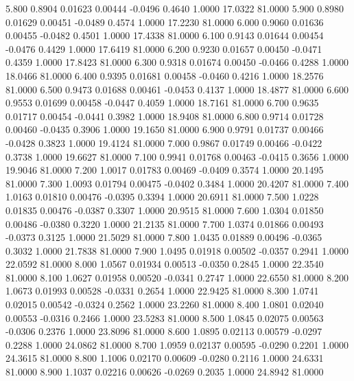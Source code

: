    5.800   0.8904   0.01623   0.00444  -0.0496   0.4640   1.0000  17.0322  81.0000
   5.900   0.8980   0.01629   0.00451  -0.0489   0.4574   1.0000  17.2230  81.0000
   6.000   0.9060   0.01636   0.00455  -0.0482   0.4501   1.0000  17.4338  81.0000
   6.100   0.9143   0.01644   0.00454  -0.0476   0.4429   1.0000  17.6419  81.0000
   6.200   0.9230   0.01657   0.00450  -0.0471   0.4359   1.0000  17.8423  81.0000
   6.300   0.9318   0.01674   0.00450  -0.0466   0.4288   1.0000  18.0466  81.0000
   6.400   0.9395   0.01681   0.00458  -0.0460   0.4216   1.0000  18.2576  81.0000
   6.500   0.9473   0.01688   0.00461  -0.0453   0.4137   1.0000  18.4877  81.0000
   6.600   0.9553   0.01699   0.00458  -0.0447   0.4059   1.0000  18.7161  81.0000
   6.700   0.9635   0.01717   0.00454  -0.0441   0.3982   1.0000  18.9408  81.0000
   6.800   0.9714   0.01728   0.00460  -0.0435   0.3906   1.0000  19.1650  81.0000
   6.900   0.9791   0.01737   0.00466  -0.0428   0.3823   1.0000  19.4124  81.0000
   7.000   0.9867   0.01749   0.00466  -0.0422   0.3738   1.0000  19.6627  81.0000
   7.100   0.9941   0.01768   0.00463  -0.0415   0.3656   1.0000  19.9046  81.0000
   7.200   1.0017   0.01783   0.00469  -0.0409   0.3574   1.0000  20.1495  81.0000
   7.300   1.0093   0.01794   0.00475  -0.0402   0.3484   1.0000  20.4207  81.0000
   7.400   1.0163   0.01810   0.00476  -0.0395   0.3394   1.0000  20.6911  81.0000
   7.500   1.0228   0.01835   0.00476  -0.0387   0.3307   1.0000  20.9515  81.0000
   7.600   1.0304   0.01850   0.00486  -0.0380   0.3220   1.0000  21.2135  81.0000
   7.700   1.0374   0.01866   0.00493  -0.0373   0.3125   1.0000  21.5029  81.0000
   7.800   1.0435   0.01889   0.00496  -0.0365   0.3032   1.0000  21.7838  81.0000
   7.900   1.0495   0.01918   0.00502  -0.0357   0.2941   1.0000  22.0592  81.0000
   8.000   1.0567   0.01934   0.00513  -0.0350   0.2845   1.0000  22.3540  81.0000
   8.100   1.0627   0.01958   0.00520  -0.0341   0.2747   1.0000  22.6550  81.0000
   8.200   1.0673   0.01993   0.00528  -0.0331   0.2654   1.0000  22.9425  81.0000
   8.300   1.0741   0.02015   0.00542  -0.0324   0.2562   1.0000  23.2260  81.0000
   8.400   1.0801   0.02040   0.00553  -0.0316   0.2466   1.0000  23.5283  81.0000
   8.500   1.0845   0.02075   0.00563  -0.0306   0.2376   1.0000  23.8096  81.0000
   8.600   1.0895   0.02113   0.00579  -0.0297   0.2288   1.0000  24.0862  81.0000
   8.700   1.0959   0.02137   0.00595  -0.0290   0.2201   1.0000  24.3615  81.0000
   8.800   1.1006   0.02170   0.00609  -0.0280   0.2116   1.0000  24.6331  81.0000
   8.900   1.1037   0.02216   0.00626  -0.0269   0.2035   1.0000  24.8942  81.0000
